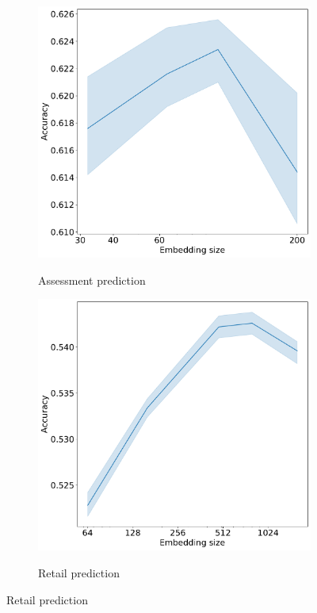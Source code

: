 \documentclass{article}
\begin{document}
\begin{figure}
\begin{subfigure}{0.5\linewidth}
    \label{fig-emb-dim-gender}
  \end{subfigure}
  \begin{subfigure}{0.5\linewidth}
    \caption{Assessment prediction}
    \includegraphics[width=\linewidth]{figures/bowl-hidden-size.pdf}
    \label{fig-emb-dim-bowl}
  \end{subfigure}%
  \begin{subfigure}{0.5\linewidth}
    \caption{Retail prediction}
    \includegraphics[width=\linewidth]{figures/x5-hidden-size.pdf}
    \label{fig-emb-dim-x5}
  \end{subfigure}
  \label{fig-emb-dim}
\end{figure}
\end{document}
